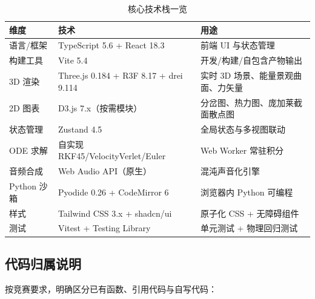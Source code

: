 \begin{table}[htbp]
  \centering
  \caption{核心技术栈一览}
  \label{tab:tech_stack}
  \begin{tabularx}{\textwidth}{l l X}
    \toprule
    \textbf{维度} & \textbf{技术} & \textbf{用途} \\
    \midrule
    语言/框架 & TypeScript 5.6 + React 18.3 & 前端 UI 与状态管理 \\
    构建工具 & Vite 5.4 & 开发/构建/自包含产物输出 \\
    3D 渲染 & Three.js 0.184 + R3F 8.17 + drei 9.114 & 实时 3D 场景、能量景观曲面、力矢量 \\
    2D 图表 & D3.js 7.x（按需模块） & 分岔图、热力图、庞加莱截面散点图 \\
    状态管理 & Zustand 4.5 & 全局状态与多视图联动 \\
    ODE 求解 & 自实现 RKF45/VelocityVerlet/Euler & Web Worker 常驻积分 \\
    音频合成 & Web Audio API（原生） & 混沌声音化引擎 \\
    Python 沙箱 & Pyodide 0.26 + CodeMirror 6 & 浏览器内 Python 可编程 \\
    样式 & Tailwind CSS 3.x + shadcn/ui & 原子化 CSS + 无障碍组件 \\
    测试 & Vitest + Testing Library & 单元测试 + 物理回归测试 \\
    \bottomrule
  \end{tabularx}
\end{table}

\subsection{代码归属说明}

按竞赛要求，明确区分已有函数、引用代码与自写代码：

